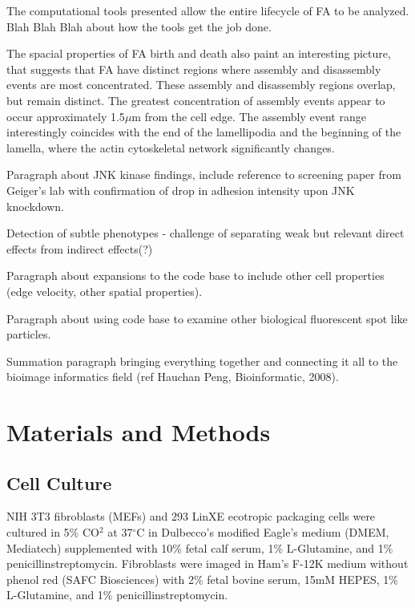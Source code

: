 \documentclass[10pt]{article}
\begin{document}
The computational tools presented allow the entire lifecycle of FA to be
analyzed. Blah Blah Blah about how the tools get the job done.

The spacial properties of FA birth and death also paint an interesting picture,
that suggests that FA have distinct regions where assembly and disassembly
events are most concentrated. These assembly and disassembly regions overlap,
but remain distinct. The greatest concentration of assembly events appear to
occur approximately 1.5$\mu$m from the cell edge. The assembly event range
interestingly coincides with the end of the lamellipodia and the beginning of
the lamella, where the actin cytoskeletal network significantly changes. 

Paragraph about JNK kinase findings, include reference to screening paper from
Geiger's lab with confirmation of drop in adhesion intensity upon JNK
knockdown.

Detection of subtle phenotypes - challenge of separating weak but relevant
direct effects from indirect effects(?)

Paragraph about expansions to the code base to include other cell properties
(edge velocity, other spatial properties).

Paragraph about using code base to examine other biological fluorescent spot
like particles.

Summation paragraph bringing everything together and connecting it all to the
bioimage informatics field (ref Hauchan Peng, Bioinformatic, 2008). 



\section*{Materials and Methods}

\subsection*{Cell Culture}

NIH 3T3 fibroblasts (MEFs) and 293 LinXE ecotropic packaging cells were cultured
in 5\% CO$^2$ at 37$^\circ$C in Dulbecco's modified Eagle's medium (DMEM, Mediatech)
supplemented with 10\% fetal calf serum, 1\% L-Glutamine, and 1\%
penicillinstreptomycin. Fibroblasts were imaged in Ham's F-12K medium without
phenol red (SAFC Biosciences) with 2\% fetal bovine serum, 15mM HEPES, 1\%
L-Glutamine, and 1\% penicillinstreptomycin. 
\end{document}
